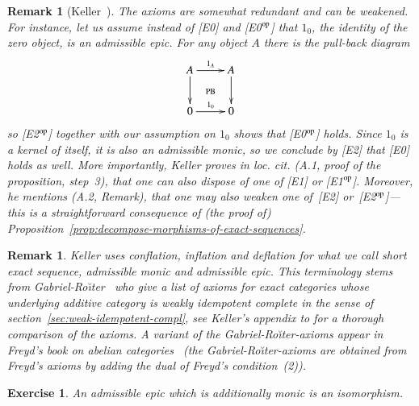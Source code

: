 \documentclass[1p]{elsarticle}
\theoremstyle{mythm}
\theoremstyle{mydef}
\newtheorem{Exer}[Thm]{Exercise}
\newtheorem{Rem}[Thm]{Remark}
\begin{document}
\begin{Rem}[Keller~{\cite[App.~A]{MR1052551}}]
  \label{rem:weakening-the-axioms}
  The axioms are somewhat redundant and can be weakened. For instance,
  let us assume instead of [E0] and [E0$^{\operatorname{op}}$]
  that $1_{0}$, the identity of the zero object, is an admissible epic.
  For any object $A$ there is the pull-back diagram
  \[
  \xymatrix{
    A \ar[d] \ar[r]^{1_{A}} \ar@{}[dr]|{\text{PB}} & A \ar[d] \\
    0 \ar[r]^{1_{0}} & 0
  }
  \]
  so [E2$^{\operatorname{op}}$] together with our assumption on $1_{0}$ 
  shows that [E0$^{\operatorname{op}}$] holds. Since
  $1_{0}$ is a kernel of itself, it is also an admissible monic, so
  we conclude by [E2] that [E0] holds as well.
  More importantly, Keller proves in \emph{loc. cit.}
  (A.1, proof of the proposition, step~3), that
  one can also dispose of one of [E1] or [E1$^{\operatorname{op}}$]. Moreover, he
  mentions (A.2, Remark), that one may
  also weaken one of~[E2] or~[E2$^{\operatorname{op}}$]---this is a straightforward
  consequence of (the proof of)
  Proposition~\ref{prop:decompose-morphisms-of-exact-sequences}.
\end{Rem}


\begin{Rem}
  Keller \cite{MR1052551, MR1421815}
  uses \emph{conflation}, \emph{inflation} and \emph{deflation}
  for what we call short exact sequence, admissible monic and
  admissible epic. This terminology stems from
  Gabriel-Ro{\u\i}ter~\cite[Ch.~9]{MR1239447}
  who give a list of axioms for exact categories whose
  underlying additive category is weakly idempotent complete in the
  sense of section~\ref{sec:weak-idempotent-compl}, see Keller's
  appendix to \cite{MR1608305} for a thorough comparison of the 
  axioms. 
  A variant of the Gabriel-Ro{\u\i}ter-axioms
  appear in Freyd's book on abelian 
  categories~\cite[Ch.~7, Exercise~G, p.~153]{MR0166240} (the
  Gabriel-Ro{\u\i}ter-axioms are obtained from Freyd's axioms by
  adding the dual of Freyd's condition~(2)).
\end{Rem}


\begin{Exer}
  \label{exer:adm-epic+monic=iso}
  An admissible epic which is additionally monic is an isomorphism.
\end{Exer}
\end{document}
